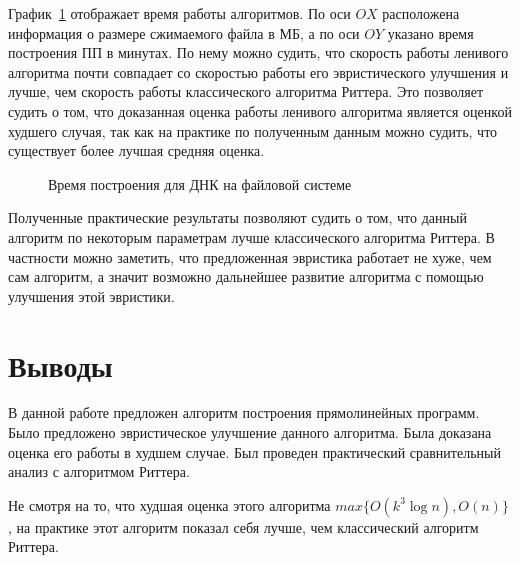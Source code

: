 \documentclass[12pt,a4paper]{extarticle}
\theoremstyle{break}
\begin{document}
График~\ref{dna_time} отображает время работы алгоритмов. По оси $OX$
расположена информация о размере сжимаемого файла в МБ, а по оси $OY$ указано
время построения ПП в минутах. По нему можно судить, что скорость работы
ленивого алгоритма почти совпадает со скоростью работы его эвристического улучшения и лучше, чем скорость работы классического алгоритма
Риттера. Это позволяет судить о том, что доказанная оценка работы ленивого
алгоритма является оценкой худшего случая, так как на практике по полученным
данным можно судить, что существует более лучшая средняя оценка.

\begin{figure}[!h]
    \caption{Время построения для ДНК на файловой системе}
    \label{dna_time}
\end{figure}

Полученные практические результаты позволяют судить о том, что данный алгоритм
по некоторым параметрам лучше классического алгоритма Риттера. В частности можно
заметить, что предложенная эвристика работает не хуже, чем сам алгоритм, а
значит возможно дальнейшее развитие алгоритма с помощью улучшения этой эвристики.

\newpage 
\section{Выводы}

В данной работе предложен алгоритм построения прямолинейных программ. Было
предложено эвристическое улучшение данного алгоритма. Была доказана оценка его
работы в худшем случае. Был проведен практический сравнительный анализ с
алгоритмом Риттера.

Не смотря на то, что худшая оценка этого алгоритма $max\{O(k^3\log n), O(n)\}$,
на практике этот алгоритм показал себя лучше, чем классический алгоритм
Риттера.
\end{document}
